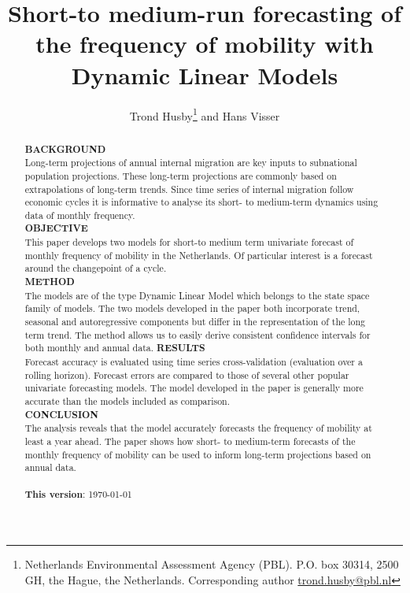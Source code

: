 \documentclass[12pt, a4paper]{article}
\begin{document}
\title{Short-to medium-run forecasting of the frequency of mobility with Dynamic Linear Models}

\author{Trond Husby\thanks{Netherlands Environmental Assessment Agency (PBL). P.O. box 30314, 2500 GH, the Hague, the Netherlands. Corresponding author \protect\url{trond.husby@pbl.nl}} and Hans Visser\footnotemark[1]}
\date{}




\newpage

\begin{abstract}
  \noindent
  \textbf{BACKGROUND} \\
  Long-term projections of annual internal migration are key inputs to subnational population projections. These long-term projections are commonly based on extrapolations of long-term trends. Since time series of internal migration follow economic cycles it is informative to analyse its short- to medium-term dynamics using data of monthly frequency. \\
\textbf{OBJECTIVE} \\
This paper develops two models for short-to medium term univariate forecast of
monthly frequency of mobility in the Netherlands. Of particular interest is a forecast around the changepoint of a cycle. \\
\textbf{METHOD} \\
The models are of the type Dynamic Linear Model which belongs to the state space family of models. The two models developed in the paper both incorporate trend, seasonal and autoregressive components but differ in the representation of the long term trend. The method allows us to easily derive consistent confidence intervals for both monthly and annual data.
\textbf{RESULTS} \\
Forecast accuracy is evaluated using time series cross-validation (evaluation over a rolling horizon). Forecast errors are compared to those of several other popular univariate forecasting models. The model developed in the paper is generally more accurate than the models included as comparison. \\
\textbf{CONCLUSION} \\
The analysis reveals that the model accurately forecasts the frequency of mobility at least a year ahead. The paper shows how short- to medium-term forecasts of the monthly frequency of mobility can be used to inform long-term projections based on annual data. \\
  \\ 
\bigskip
\textbf{This version}: {\today}

\end{abstract}
\end{document}
